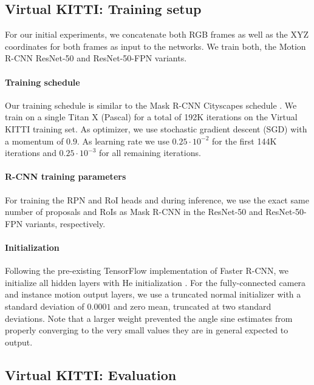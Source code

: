 \subsection{Virtual KITTI: Training setup}
\label{ssec:setup}

For our initial experiments, we concatenate both RGB frames as
well as the XYZ coordinates for both frames as input to the networks.
We train both, the Motion R-CNN ResNet-50 and ResNet-50-FPN variants.

\paragraph{Training schedule}
Our training schedule is similar to the Mask R-CNN Cityscapes schedule \cite{MaskRCNN}.
We train on a single Titan X (Pascal) for a total of 192K iterations on the
Virtual KITTI training set.
As optimizer, we use stochastic gradient descent (SGD) \cite{SGD} with a
momentum of $0.9$.
As learning rate we use $0.25 \cdot 10^{-2}$ for the
first 144K iterations and $0.25 \cdot 10^{-3}$ for all remaining iterations.

\paragraph{R-CNN training parameters}
For training the RPN and RoI heads and during inference,
we use the exact same number of proposals and RoIs as Mask R-CNN in
the ResNet-50 and ResNet-50-FPN variants, respectively.

\paragraph{Initialization}
Following the pre-existing TensorFlow implementation of Faster R-CNN,
we initialize all hidden layers with He initialization \cite{He}.
For the fully-connected camera and instance motion output layers,
we use a truncated normal initializer with a standard
deviation of $0.0001$ and zero mean, truncated at two standard deviations.
Note that a larger weight prevented the
angle sine estimates from properly converging to the very small values they
are in general expected to output.

\subsection{Virtual KITTI: Evaluation}
\label{ssec:vkitti}

